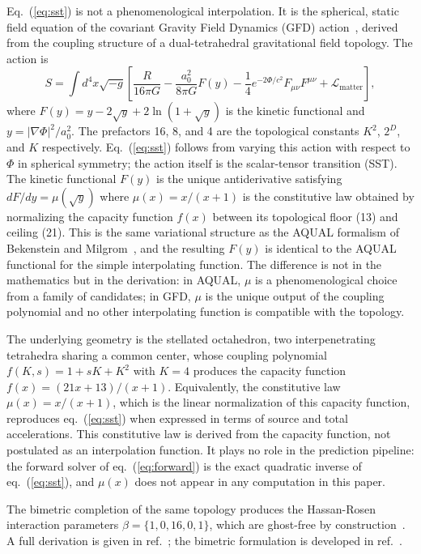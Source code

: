 \documentclass[a4paper,11pt]{article}
\begin{document}
Eq.~(\ref{eq:sst}) is not a phenomenological interpolation. It is the spherical, static field equation of the covariant Gravity Field Dynamics (GFD) action~\cite{nelson2025a}, derived from the coupling structure of a dual-tetrahedral gravitational field topology. The action is
\begin{equation}
S = \int d^4x \sqrt{-g} \left[ \frac{R}{16\pi G} - \frac{a_0^2}{8\pi G} F(y) - \frac{1}{4} e^{-2\Phi/c^2} F_{\mu\nu}F^{\mu\nu} + \mathcal{L}_{\mathrm{matter}} \right],
\label{eq:action}
\end{equation}
where $F(y) = y - 2\sqrt{y} + 2\ln(1+\sqrt{y})$ is the kinetic functional and $y = |\nabla\Phi|^2/a_0^2$. The prefactors 16, 8, and 4 are the topological constants $K^2$, $2^D$, and $K$ respectively. Eq.~(\ref{eq:sst}) follows from varying this action with respect to $\Phi$ in spherical symmetry; the action itself is the scalar-tensor transition (SST). The kinetic functional $F(y)$ is the unique antiderivative satisfying $dF/dy = \mu(\sqrt{y})$ where $\mu(x) = x/(x+1)$ is the constitutive law obtained by normalizing the capacity function $f(x)$ between its topological floor (13) and ceiling (21). This is the same variational structure as the AQUAL formalism of Bekenstein and Milgrom~\cite{bekenstein1984}, and the resulting $F(y)$ is identical to the AQUAL functional for the simple interpolating function. The difference is not in the mathematics but in the derivation: in AQUAL, $\mu$ is a phenomenological choice from a family of candidates; in GFD, $\mu$ is the unique output of the coupling polynomial and no other interpolating function is compatible with the topology.

The underlying geometry is the stellated octahedron, two interpenetrating tetrahedra sharing a common center, whose coupling polynomial $f(K, s) = 1 + sK + K^2$ with $K = 4$ produces the capacity function $f(x) = (21x + 13)/(x + 1)$. Equivalently, the constitutive law $\mu(x) = x/(x+1)$, which is the linear normalization of this capacity function, reproduces eq.~(\ref{eq:sst}) when expressed in terms of source and total accelerations. This constitutive law is derived from the capacity function, not postulated as an interpolation function. It plays no role in the prediction pipeline: the forward solver of eq.~(\ref{eq:forward}) is the exact quadratic inverse of eq.~(\ref{eq:sst}), and $\mu(x)$ does not appear in any computation in this paper.

The bimetric completion of the same topology produces the Hassan-Rosen interaction parameters $\beta = \{1, 0, 16, 0, 1\}$, which are ghost-free by construction~\cite{hassan2012}. A full derivation is given in ref.~\cite{nelson2025a}; the bimetric formulation is developed in ref.~\cite{nelson2025b}.
\end{document}
